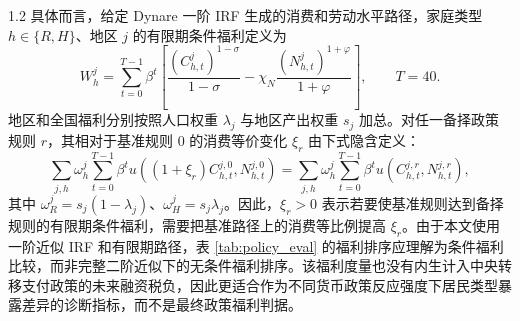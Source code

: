 \documentclass[12pt,UTF8]{ctexart}
\begin{document}
\begin{spacing}{1.2}
		具体而言，给定 Dynare 一阶 IRF 生成的消费和劳动水平路径，家庭类型 $h\in\{R,H\}$、地区 $j$ 的有限期条件福利定义为
		\begin{equation}
			W_h^j
			=
			\sum_{t=0}^{T-1}\beta^t
			\left[
			\frac{(C_{h,t}^j)^{1-\sigma}}{1-\sigma}
			-\chi_N\frac{(N_{h,t}^j)^{1+\varphi}}{1+\varphi}
			\right],
			\qquad T=40.
			\label{eq:welfare_def}
		\end{equation}
		地区和全国福利分别按照人口权重 $\lambda_j$ 与地区产出权重 $s_j$ 加总。对任一备择政策规则 $r$，其相对于基准规则 $0$ 的消费等价变化 $\xi_r$ 由下式隐含定义：
		\begin{equation}
			\sum_{j,h}\omega_h^j
			\sum_{t=0}^{T-1}\beta^t
			u\left((1+\xi_r)C_{h,t}^{j,0},N_{h,t}^{j,0}\right)
			=
			\sum_{j,h}\omega_h^j
			\sum_{t=0}^{T-1}\beta^t
			u\left(C_{h,t}^{j,r},N_{h,t}^{j,r}\right),
			\label{eq:cev_def}
		\end{equation}
		其中 $\omega_R^j=s_j(1-\lambda_j)$、$\omega_H^j=s_j\lambda_j$。因此，$\xi_r>0$ 表示若要使基准规则达到备择规则的有限期条件福利，需要把基准路径上的消费等比例提高 $\xi_r$。由于本文使用一阶近似 IRF 和有限期路径，表 \ref{tab:policy_eval} 的福利排序应理解为条件福利比较，而非完整二阶近似下的无条件福利排序。该福利度量也没有内生计入中央转移支付政策的未来融资税负，因此更适合作为不同货币政策反应强度下居民类型暴露差异的诊断指标，而不是最终政策福利判据。
		

\end{spacing}
\end{document}
